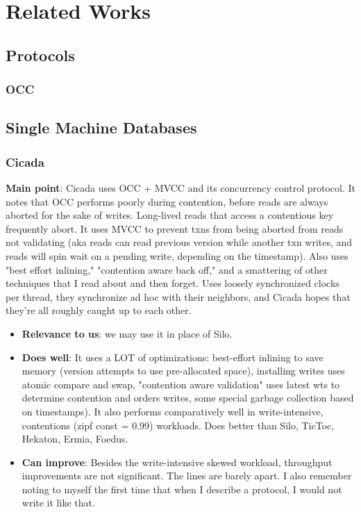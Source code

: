 \section{Related Works}
\subsection{Protocols}
\subsubsection{OCC}
\cite{occhtkung}
\subsection{Single Machine Databases}

\subsubsection{Cicada}
\textbf{Main point}: Cicada \cite{cicada} uses OCC + MVCC and its concurrency control protocol. It notes that OCC performs poorly during contention, before reads are always aborted for the sake of writes. Long-lived reads that access a contentious key frequently abort. It uses MVCC to prevent txns from being aborted from reads not validating (aka reads can read previous version while another txn writes, and reads will spin wait on a pending write, depending on the timestamp). Also uses "best effort inlining," "contention aware back off," and a smattering of other techniques that I read about and then forget. Uses loosely synchronized clocks per thread, they synchronize ad hoc with their neighbors, and Cicada hopes that they're all roughly caught up to each other.
\begin{itemize}
    \item \textbf{Relevance to us}: we may use it in place of Silo. 
    \item \textbf{Does well}: It uses a LOT of optimizations: best-effort inlining to save memory (version attempts to use pre-allocated space), installing writes uses atomic compare and swap, "contention aware validation" uses latest wts to determine contention and orders writes, some special garbage collection based on timestamps). It also performs comparatively well in write-intensive, contentions (zipf const = 0.99) workloads. Does better than Silo, TicToc, Hekaton, Ermia, Foedus.
    \item\textbf{Can improve}: Besides the write-intensive skewed workload, throughput improvements are not significant. The lines are barely apart. I also remember noting to myself the first time that when I describe a protocol, I would not write it like that.  
\end{itemize}
